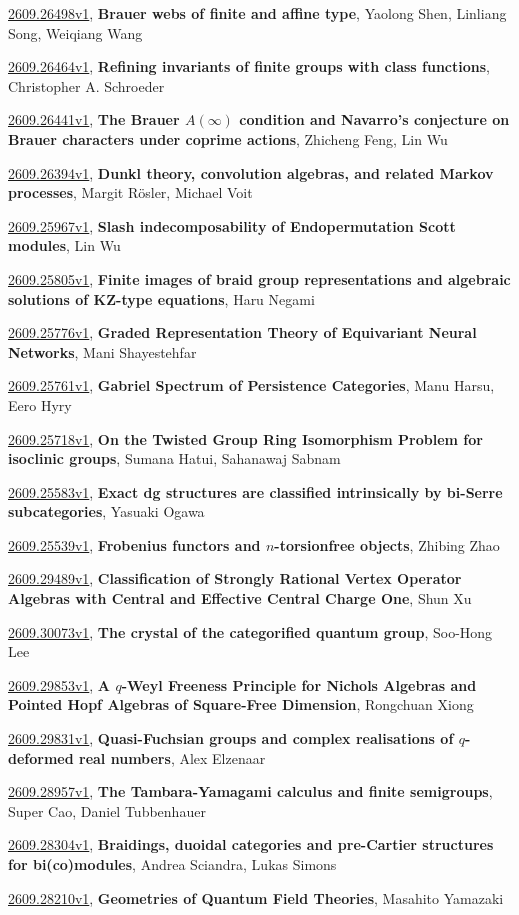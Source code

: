 \documentclass[9pt, a4paper]{article}
\theoremstyle{plain}
\theoremstyle{definition}
\theoremstyle{remark}
\newcommand{\arxiv}[3]{\href{https://arxiv.org/abs/#1}{#1}, \textbf{\textcolor{arxivblue}{#2}}, #3}
\begin{document}
\arxiv{2609.26498v1}{Brauer webs of finite and affine type}{Yaolong Shen, Linliang Song, Weiqiang Wang}

\arxiv{2609.26464v1}{Refining invariants of finite groups with class functions}{Christopher A. Schroeder}

\arxiv{2609.26441v1}{The Brauer $A(\infty)$ condition and Navarro's conjecture on Brauer characters under coprime actions}{Zhicheng Feng, Lin Wu}

\arxiv{2609.26394v1}{Dunkl theory, convolution algebras, and related Markov processes}{Margit Rösler, Michael Voit}

\arxiv{2609.25967v1}{Slash indecomposability of Endopermutation Scott modules}{Lin Wu}

\arxiv{2609.25805v1}{Finite images of braid group representations and algebraic solutions of KZ-type equations}{Haru Negami}

\arxiv{2609.25776v1}{Graded Representation Theory of Equivariant Neural Networks}{Mani Shayestehfar}

\arxiv{2609.25761v1}{Gabriel Spectrum of Persistence Categories}{Manu Harsu, Eero Hyry}

\arxiv{2609.25718v1}{On the Twisted Group Ring Isomorphism Problem for isoclinic groups}{Sumana Hatui, Sahanawaj Sabnam}

\arxiv{2609.25583v1}{Exact dg structures are classified intrinsically by bi-Serre subcategories}{Yasuaki Ogawa}

\arxiv{2609.25539v1}{Frobenius functors and $n$-torsionfree objects}{Zhibing Zhao}

\arxiv{2609.29489v1}{Classification of Strongly Rational Vertex Operator Algebras with Central and Effective Central Charge One}{Shun Xu}

\arxiv{2609.30073v1}{The crystal of the categorified quantum group}{Soo-Hong Lee}

\arxiv{2609.29853v1}{A $q$-Weyl Freeness Principle for Nichols Algebras and Pointed Hopf Algebras of Square-Free Dimension}{Rongchuan Xiong}

\arxiv{2609.29831v1}{Quasi-Fuchsian groups and complex realisations of $q$-deformed real numbers}{Alex Elzenaar}

\arxiv{2609.28957v1}{The Tambara-Yamagami calculus and finite semigroups}{Super Cao, Daniel Tubbenhauer}

\arxiv{2609.28304v1}{Braidings, duoidal categories and pre-Cartier structures for bi(co)modules}{Andrea Sciandra, Lukas Simons}

\arxiv{2609.28210v1}{Geometries of Quantum Field Theories}{Masahito Yamazaki}
\end{document}
